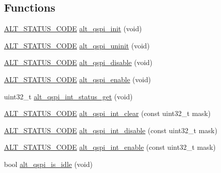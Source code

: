 \subsection*{Functions}
\begin{DoxyCompactItemize}
\item 
\mbox{\hyperlink{hwlib_8h_abdb0d369f069723ca55d6c94bcaaaa12}{A\+L\+T\+\_\+\+S\+T\+A\+T\+U\+S\+\_\+\+C\+O\+DE}} \mbox{\hyperlink{group__ALT__QSPI__CSR_gaecd5fe1f525bf35cd38257148b6be226}{alt\+\_\+qspi\+\_\+init}} (void)
\item 
\mbox{\hyperlink{hwlib_8h_abdb0d369f069723ca55d6c94bcaaaa12}{A\+L\+T\+\_\+\+S\+T\+A\+T\+U\+S\+\_\+\+C\+O\+DE}} \mbox{\hyperlink{group__ALT__QSPI__CSR_gae1149191120939cb56f2bea8be12ae3c}{alt\+\_\+qspi\+\_\+uninit}} (void)
\item 
\mbox{\hyperlink{hwlib_8h_abdb0d369f069723ca55d6c94bcaaaa12}{A\+L\+T\+\_\+\+S\+T\+A\+T\+U\+S\+\_\+\+C\+O\+DE}} \mbox{\hyperlink{group__ALT__QSPI__CSR_ga22df5a849bd115eef330974c03734fc1}{alt\+\_\+qspi\+\_\+disable}} (void)
\item 
\mbox{\hyperlink{hwlib_8h_abdb0d369f069723ca55d6c94bcaaaa12}{A\+L\+T\+\_\+\+S\+T\+A\+T\+U\+S\+\_\+\+C\+O\+DE}} \mbox{\hyperlink{group__ALT__QSPI__CSR_ga68501b9717901e2d160297a802728772}{alt\+\_\+qspi\+\_\+enable}} (void)
\item 
uint32\+\_\+t \mbox{\hyperlink{group__ALT__QSPI__CSR_ga6eeaf36913f59120b21affa31d6f9632}{alt\+\_\+qspi\+\_\+int\+\_\+status\+\_\+get}} (void)
\item 
\mbox{\hyperlink{hwlib_8h_abdb0d369f069723ca55d6c94bcaaaa12}{A\+L\+T\+\_\+\+S\+T\+A\+T\+U\+S\+\_\+\+C\+O\+DE}} \mbox{\hyperlink{group__ALT__QSPI__CSR_gaf436f88abd8e2af796cc070792db5168}{alt\+\_\+qspi\+\_\+int\+\_\+clear}} (const uint32\+\_\+t mask)
\item 
\mbox{\hyperlink{hwlib_8h_abdb0d369f069723ca55d6c94bcaaaa12}{A\+L\+T\+\_\+\+S\+T\+A\+T\+U\+S\+\_\+\+C\+O\+DE}} \mbox{\hyperlink{group__ALT__QSPI__CSR_gabafd6da28abc48578f144cbd6c85e224}{alt\+\_\+qspi\+\_\+int\+\_\+disable}} (const uint32\+\_\+t mask)
\item 
\mbox{\hyperlink{hwlib_8h_abdb0d369f069723ca55d6c94bcaaaa12}{A\+L\+T\+\_\+\+S\+T\+A\+T\+U\+S\+\_\+\+C\+O\+DE}} \mbox{\hyperlink{group__ALT__QSPI__CSR_ga90573895220218be5c3be1888010e5bc}{alt\+\_\+qspi\+\_\+int\+\_\+enable}} (const uint32\+\_\+t mask)
\item 
bool \mbox{\hyperlink{group__ALT__QSPI__CSR_gaeaa7e762d8b79b1989385c978174b7b8}{alt\+\_\+qspi\+\_\+is\+\_\+idle}} (void)
\end{DoxyCompactItemize}


